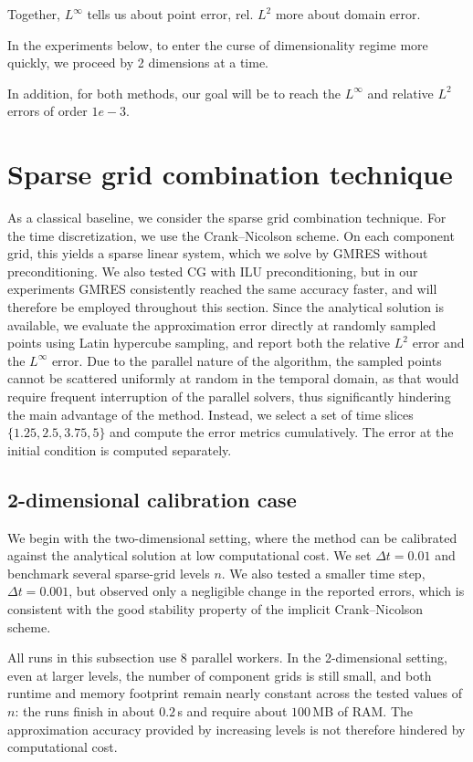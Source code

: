 Together, $L^\infty$ tells us about point error, rel. $L^2$ more about domain error.


In the experiments below,
to enter the curse of dimensionality regime more quickly,
we proceed by 2 dimensions at a time.

In addition, for both methods, our goal will be to reach the $L^\infty$ and relative $L^2$ errors of order $1e-3$.


\section{Sparse grid combination technique}

As a classical baseline, we consider the sparse grid combination technique.
For the time discretization, we use the Crank--Nicolson scheme.
On each component grid, this yields a sparse linear system, which we solve by GMRES without preconditioning.
We also tested CG with ILU preconditioning, but in our experiments GMRES consistently reached the same accuracy faster,
and will therefore be employed throughout this section.
Since the analytical solution is available, we evaluate the approximation error directly at randomly sampled points using Latin hypercube sampling,
and report both the relative $L^2$ error and the $L^\infty$ error.
Due to the parallel nature of the algorithm, the sampled points cannot be scattered uniformly at random
in the temporal domain, as that would require frequent interruption of the parallel solvers, thus significantly
hindering the main advantage of the method. Instead, we select a set of time slices $\{1.25, 2.5, 3.75, 5\}$
and compute the error metrics cumulatively.
The error at the initial condition is computed separately.


\subsection{2-dimensional calibration case}

We begin with the two-dimensional setting, where the method can be calibrated against the analytical solution at low computational cost.
We set $\Delta t=0.01$ and benchmark several sparse-grid levels $n$.
We also tested a smaller time step, $\Delta t=0.001$, but observed only a negligible change in the reported errors,
which is consistent with the good stability property of the implicit Crank--Nicolson scheme.

All runs in this subsection use 8 parallel workers.
In the 2-dimensional setting, even at larger levels, the number of component grids is still small,
and both runtime and memory footprint remain nearly constant across the tested values of $n$:
the runs finish in about $0.2$\,s and require about $100$\,MB of RAM.
The approximation accuracy provided by increasing levels is not therefore
hindered by computational cost.

